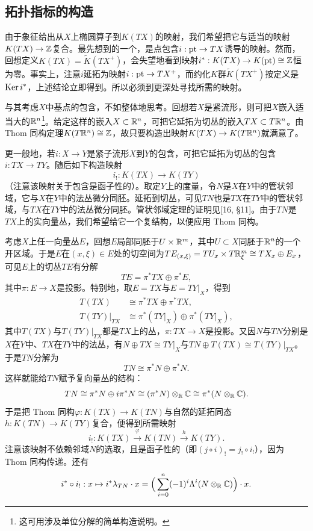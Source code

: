 
\subsection{拓扑指标的构造}
由于象征给出从$X$上椭圆算子到$K(TX)$的映射，我们希望把它与适当的映射$K(TX)\to\mathbb{Z}$复合。最先想到的一个，是点包含$i:\mathrm{pt}\to TX$诱导的映射。然而，回想定义$K(TX)=\tilde K(TX^+)$，会失望地看到映射$i^*:K(TX)\to K(\mathrm{pt})\cong\mathbb{Z}$恒为零。事实上，注意$i$延拓为映射$i:\mathrm{pt}\to TX^+$，而约化$K$群$\tilde K(TX^+)$按定义是$\operatorname{Ker} i^*$，上述结论立即得到。所以必须到更深处寻找所需的映射。

与其考虑$X$中基点的包含，不如整体地思考。回想若$X$是紧流形，则可把$X$嵌入适当大的$\mathbb{R}^n$\footnote{这可用涉及单位分解的简单构造说明。}。给定这样的嵌入$X\subset\mathbb{R}^n$，可把它延拓为切丛的嵌入$TX\subset T\mathbb{R}^n$。由 Thom 同构定理$K(T\mathbb{R}^n)\cong\mathbb{Z}$，故只要构造出映射$K(TX)\to K(T\mathbb{R}^n)$就满意了。

更一般地，若$i:X\to Y$是紧子流形$X$到$Y$的包含，可把它延拓为切丛的包含$i:TX\to TY$。随后如下构造映射
\[
i_!:K(TX)\to K(TY)
\]
（注意该映射关于包含是函子性的）。取定$Y$上的度量，令$N$是$X$在$Y$中的管状邻域，它与$X$在$Y$中的法丛微分同胚。延拓到切丛，可见$TN$也是$TX$在$TY$中的管状邻域，与$TX$在$TY$中的法丛微分同胚。管状邻域定理的证明见[16, §11]。由于$TN$是$TX$上的实向量丛，我们希望给它一个复结构，以便应用 Thom 同构。

考虑$X$上任一向量丛$E$，回想$E$局部同胚于$U\times\mathbb{R}^m$，其中$U\subset X$同胚于$\mathbb{R}^n$的一个开区域。于是$E$在$(x,\xi)\in E$处的切空间为$TE_{(x,\xi)}=TU_x\times T\mathbb{R}^m_\xi\cong TX_x\oplus E_x$，可见$E$上的切丛$TE$有分解
\[
TE=\pi^*TX\oplus\pi^*E,
\]
其中$\pi:E\to X$是投影。特别地，取$E=TX$与$E=TY|_X$，得到
\begin{align*}
T(TX)&\cong\pi^*TX\oplus\pi^*TX,\\
T(TY)|_{TX}&\cong\pi^*(TY|_X)\oplus\pi^*(TY|_X),
\end{align*}
其中$T(TX)$与$T(TY)|_{TX}$都是$TX$上的丛，$\pi:TX\to X$是投影。又因$N$与$TN$分别是$X$在$Y$中、$TX$在$TY$中的法丛，有$N\oplus TX\cong TY|_X$与$TN\oplus T(TX)\cong T(TY)|_{TX}$。于是$TN$分解为
\[
TN\cong\pi^*N\oplus\pi^*N.
\]
这样就能给$TN$赋予复向量丛的结构：
\[
TN\cong\pi^*N\oplus i\pi^*N\cong(\pi^*N)\otimes_{\mathbb{R}}\mathbb{C}\cong\pi^*(N\otimes_{\mathbb{R}}\mathbb{C}).
\]
于是把 Thom 同构$\varphi:K(TX)\to K(TN)$与自然的延拓同态$h:K(TN)\to K(TY)$复合，便得到所需映射
\[
i_!:K(TX)\xrightarrow{\ \varphi\ }K(TN)\xrightarrow{\ h\ }K(TY).
\]
注意该映射不依赖邻域$N$的选取，且是函子性的（即$(j\circ i)_!=j_!\circ i_!$），因为 Thom 同构传递。还有
\[
i^*\circ i_!:x\mapsto i^*\lambda_{TN}\cdot x=\Big(\sum_{i=0}^n(-1)^i\Lambda^i(N\otimes_{\mathbb{R}}\mathbb{C})\Big)\cdot x.
\]

